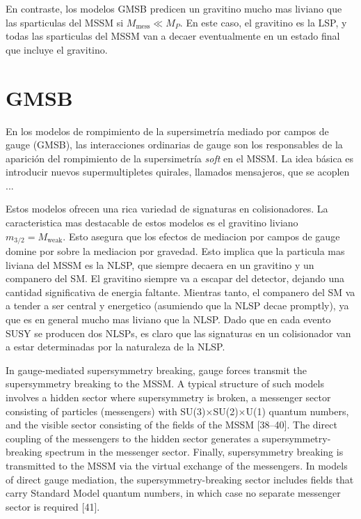 En contraste, los modelos GMSB predicen un gravitino mucho mas
liviano que las sparticulas del MSSM si $M_\text{mess} \ll M_P$.
En este caso, el gravitino es la LSP, y todas las sparticulas
del MSSM van a decaer eventualmente en un estado final que incluye
el gravitino.








\section{GMSB} %

En los modelos de rompimiento de la supersimetría mediado por campos de gauge
(GMSB), las interacciones ordinarias de gauge son los responsables de la
aparición del rompimiento de la supersimetría \emph{soft} en el MSSM.
La idea básica es introducir
nuevos supermultipletes quirales, llamados mensajeros, que se acoplen ...

Estos modelos ofrecen una rica variedad de signaturas en colisionadores.
La caracteristica mas destacable de estos modelos es el gravitino liviano
$m_{3/2} = M_\text{weak}$. Esto asegura que los efectos de mediacion por
campos de gauge domine por sobre la mediacion por gravedad. Esto implica
que la particula mas liviana del MSSM es la NLSP, que siempre decaera
en un gravitino y un companero del SM.
El gravitino siempre va a escapar del detector, dejando una cantidad
significativa de energia faltante. Mientras tanto, el companero del SM va
a tender a ser central y energetico (asumiendo que la NLSP decae promptly),
ya que es en general mucho mas liviano que la NLSP. Dado que en cada evento
SUSY se producen dos NLSPs, es claro que las signaturas en un colisionador
van a estar determinadas por la naturaleza de la NLSP.


In gauge-mediated supersymmetry breaking, gauge forces
transmit the supersymmetry breaking to the MSSM. A typical
structure of such models involves a hidden sector where supersymmetry
is broken, a messenger sector consisting of particles
(messengers) with SU(3)×SU(2)×U(1) quantum numbers, and
the visible sector consisting of the fields of the MSSM [38–40].
The direct coupling of the messengers to the hidden sector generates
a supersymmetry-breaking spectrum in the messenger
sector. Finally, supersymmetry breaking is transmitted to the
MSSM via the virtual exchange of the messengers. In models
of direct gauge mediation, the supersymmetry-breaking sector
includes fields that carry Standard Model quantum numbers, in
which case no separate messenger sector is required [41].

